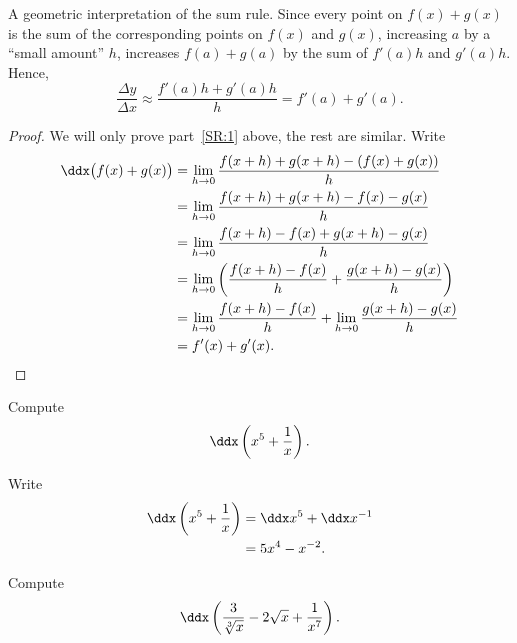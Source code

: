 \begin{marginfigure}
\label{figure:sum-rule}
\caption{A geometric interpretation of the sum rule. Since every
  point on $f(x)+g(x)$ is the sum of the corresponding points on
  $f(x)$ and $g(x)$, increasing $a$ by a ``small amount'' $h$,
  increases $f(a)+g(a)$ by the sum of $f'(a)h$ and
  $g'(a)h$. Hence, 
\[
\frac{\Delta y}{\Delta x}\approx \frac{f'(a)h+g'(a)h}{h} = f'(a) + g'(a).
\]}
\end{marginfigure}

\begin{proof}
We will only prove part~\ref{SR:1} above, the rest are similar. Write
\begin{align*}
\ddx\big(f(x)+g(x)\big) &= \lim_{ h\to 0} {f(x+h)+g(x+ h) - (f(x)+g(x))\over  h}  \\
&= \lim_{ h\to 0} {f(x+h)+g(x+ h) - f(x)-g(x)\over  h}  \\
&= \lim_{ h\to 0} {f(x+h)-f(x) +g(x+ h) -g(x)\over  h}  \\
&= \lim_{ h\to 0} \left({f(x+h)-f(x)\over  h}  +{g(x+ h) -g(x)\over  h}\right)  \\
&= \lim_{ h\to 0} {f(x+h)-f(x)\over  h}  +
\lim_{ h\to 0} {g(x+ h) -g(x)\over  h}  \\
&=f'(x)+g'(x).
\end{align*}
\end{proof}



\begin{example}
Compute
\[
\ddx \left( x^5+\frac{1}{x}\right).
\] 
\end{example}

\begin{solution}
Write
\begin{align*}
\ddx \left(x^5+\frac{1}{x}\right) &= \ddx x^5 + \ddx x^{-1} \\
&=5x^4 - x^{-2}.
\end{align*}
\end{solution}

\begin{example}
Compute
\[
\ddx \left(\frac{3}{\sqrt[3]{x}}-2\sqrt{x}+\frac{1}{x^7}\right).
\]
\end{example}

